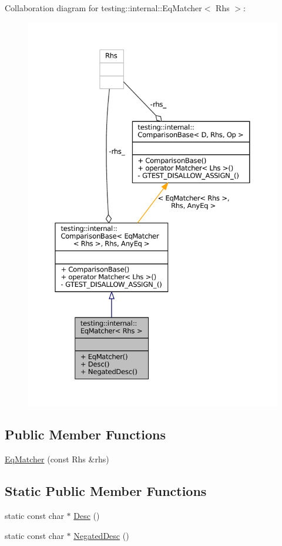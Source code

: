 Collaboration diagram for testing\+:\+:internal\+:\+:Eq\+Matcher$<$ Rhs $>$\+:
\nopagebreak
\begin{figure}[H]
\begin{center}
\leavevmode
\includegraphics[width=350pt]{classtesting_1_1internal_1_1EqMatcher__coll__graph}
\end{center}
\end{figure}
\subsection*{Public Member Functions}
\begin{DoxyCompactItemize}
\item 
\hyperlink{classtesting_1_1internal_1_1EqMatcher_a9051e33bc31f413a3c958d04cc090b46}{Eq\+Matcher} (const Rhs \&rhs)
\end{DoxyCompactItemize}
\subsection*{Static Public Member Functions}
\begin{DoxyCompactItemize}
\item 
static const char $\ast$ \hyperlink{classtesting_1_1internal_1_1EqMatcher_a3ddc72ceade061ad56debfa0a4dc2749}{Desc} ()
\item 
static const char $\ast$ \hyperlink{classtesting_1_1internal_1_1EqMatcher_ae99a542c124694d5b91793a2df9202dc}{Negated\+Desc} ()
\end{DoxyCompactItemize}


